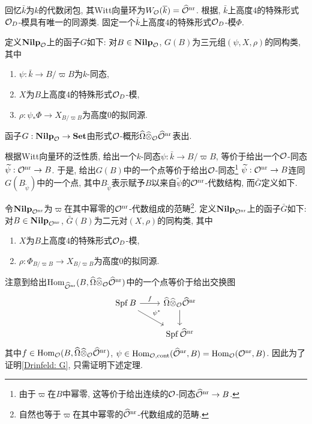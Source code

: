 回忆$\bar{k}$为$k$的代数闭包, 其Witt向量环为$W_{\mathcal{O}}(\overline{k}) = \widehat{\mathcal{O}}^{\mathrm{nr}}$.
根据\cite[II, 5.2]{BC91}, $\bar{k}$上高度$4$的特殊形式$\mathcal{O}_D$-模具有唯一的同源类.
固定一个$\bar{k}$上高度$4$的特殊形式$\mathcal{O}_D$-模$\Phi$.

\begin{definition}
    定义$\mathbf{Nilp}_{\mathcal{O}}$上的函子$G$如下: 对$B\in\mathbf{Nilp}_{\mathcal{O}}$, $G(B)$为三元组$(\psi, X, \rho)$的同构类, 其中\begin{enumerate}
        \item [\myit] $\psi : \bar{k}\to B/\varpi B$为$k$-同态,
        \item [\myit] $X$为$B$上高度$4$的特殊形式$\mathcal{O}_D$-模,
        \item [\myit] $\rho : \psi_*\Phi\to X_{B/\varpi B}$为高度$0$的拟同源.
    \end{enumerate}
\end{definition}

\begin{theorem}[Drinfeld]\label{Drinfeld: G}
    函子$G : \mathbf{Nilp}_{\mathcal{O}}\to\mathbf{Set}$由形式$\mathcal{O}$-概形$\widehat{\Omega}\widehat{\otimes}_{\mathcal{O}}\widehat{\mathcal{O}}^{\mathrm{nr}}$表出.
\end{theorem}

根据Witt向量环的泛性质, 给出一个$k$-同态$\psi:\bar{k}\to B/\varpi B$, 等价于给出一个$\mathcal{O}$-同态$\widetilde{\psi} : \mathcal{O}^{\mathrm{nr}}\to B$.
于是, 给出$G(B)$中的一个点等价于给出$\mathcal{O}$-同态\footnote{由于$\varpi$在$B$中幂零, 这等价于给出连续的$\mathcal{O}$-同态$\widehat{\mathcal{O}}^{\mathrm{nr}}\to B$.}
$\widetilde{\psi} : \mathcal{O}^{\mathrm{nr}}\to B$连同$G(B_{\tilde{\psi}})$中的一个点,
其中$B_{\tilde{\psi}}$表示赋予$B$以来自$\tilde{\psi}$的$\mathcal{O}^{\mathrm{nr}}$-代数结构,
而$\bar{G}$定义如下.

\begin{definition}
    令$\mathbf{Nilp}_{\mathcal{O}^{\mathrm{nr}}}$为$\varpi$在其中幂零的$\mathcal{O}^{\mathrm{nr}}$-代数组成的范畴\footnote{自然也等于$\varpi$在其中幂零的$\widehat{\mathcal{O}}^{\mathrm{nr}}$-代数组成的范畴.}.
    定义$\mathbf{Nilp}_{\mathcal{O}^{\mathrm{nr}}}$上的函子$\bar{G}$如下: 对$B\in\mathbf{Nilp}_{\mathcal{O}^{\mathrm{nr}}}$, $\bar{G}(B)$为二元对$(X, \rho)$的同构类, 其中\begin{enumerate}
        \item [\myit] $X$为$B$上高度$4$的特殊形式$\mathcal{O}_D$-模,
        \item [\myit] $\rho : \Phi_{B/\varpi B}\to X_{B/\varpi B}$为高度$0$的拟同源.
    \end{enumerate}
\end{definition}


注意到给出$\operatorname{Hom}_{\widehat{\mathcal{O}}^{\mathrm{nr}}}(B, \widehat{\Omega}\widehat{\otimes}_{\mathcal{O}}\widehat{\mathcal{O}}^{\mathrm{nr}})$中的一个点等价于给出交换图
\[\begin{tikzcd}
    \spf B \arrow[r, "f"] \arrow[rd, "\psi^*"] & \hat{\Omega}\hat{\otimes}_{\O}\hat{\O}^\nr \arrow[d] \\
                                               & \spf \hat{\O}^\nr                                   
    \end{tikzcd}\]
其中$f\in\operatorname{Hom}_{\mathcal{O}}(B, \widehat{\Omega}\widehat{\otimes}_{\mathcal{O}}\widehat{\mathcal{O}}^{\mathrm{nr}})$, $\psi\in\operatorname{Hom}_{\mathcal{O}, \mathrm{cont}}(\widehat{\mathcal{O}}^{\mathrm{nr}}, B) = \operatorname{Hom}_{\mathcal{O}}(\mathcal{O}^{\mathrm{nr}}, B)$.
因此为了证明\cref{Drinfeld: G}, 只需证明下述定理.

